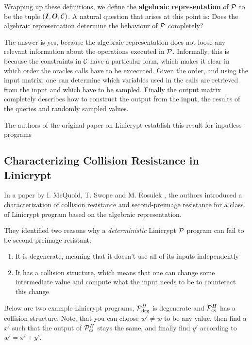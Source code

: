 Wrapping up these definitions,
we define the \textbf{algebraic representation} of $\P$ to be the tuple $(\Inp, \O, \C)$.
A natural question that arises at this point is:
Does the algebraic representation determine the behaviour of $\P$ completely?

The answer is yes, because the algebraic representation does not loose any relevant information about the operations executed in $\P$.
Informally, this is because the constraints in $\C$ have a particular form, which makes it clear in which order the oracles calls have to be excecuted.
Given the order, and using the input matrix, one can determine which variables used in the calls are retrieved from the input and which have to be sampled.
Finally the output matrix completely describes how to construct the output from the input,
the results of the queries and randomly sampled values. 

The authors of the original paper on Linicrypt \cite{C:CarRos16} establish this result for inputless programs

\subsection{Characterizing Collision Resistance in Linicrypt}

In a paper by I. McQuoid, T. Swope and M. Rosulek
\cite[Characterizing Collision and Second-Preimage Resistance in Linicrypt]{RMS20},
the authors introduced a characterization of collision resistance
and second-preimage resistance for a class of Linicrypt program based on the algebraic representation.

They identified two reasons why a \textit{deterministic} Linicrypt $\P$ program can fail to be second-preimage resistant:
\begin{enumerate}
  \item It is degenerate, meaning that it doesn't use all of its inputs independently
  \item It has a collision structure,
    which means that one can change some intermediate value and compute what the input needs to be to counteract this change
\end{enumerate}

Below are two example Linicrypt programs, $\P^\H_\textrm{deg}$ is degenerate and $\P^\H_\textrm{cs}$ has a collision structure.
Note, that you can choose $w' \neq w$ to be any value,
then find a $x'$ such that the output of $\P^\H_{\textrm{cs}}$ stays the same,
and finally find $y'$ according to $w' = x' + y'$.

